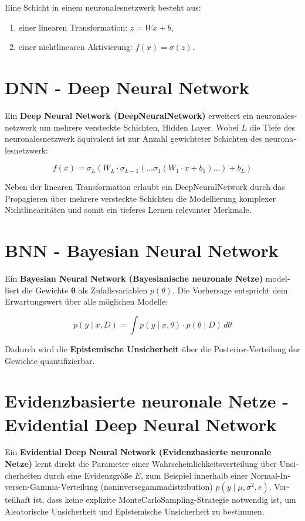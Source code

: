 \begin{otherlanguage}{ngerman}
Eine Schicht in einem \gls{neuronalesnetzwerk} besteht aus:
\begin{enumerate}
  \item einer linearen Transformation: \( z = Wx + b \),
  \item einer nichtlinearen Aktivierung: \( f(x) = \sigma(z) \).
\end{enumerate}


\section*{DNN - Deep Neural Network}

Ein \textbf{Deep Neural Network (\gls{DeepNeuralNetwork})} erweitert ein \gls{neuronalesnetzwerk} um mehrere versteckte Schichten, Hidden Layer. Wobei $L$ die Tiefe des \gls{neuronalesnetzwerk} äquivalent ist zur Anzahl gewichteter Schichten des \gls{neuronalesnetzwerk}:

\[
f(x) = \sigma_L\left(W_L \cdot \sigma_{L-1}\left(\ldots \sigma_1\left(W_1 \cdot x + b_1\right) \ldots \right) + b_L\right)
\]

Neben der linearen Transformation erlaubt ein \gls{DeepNeuralNetwork} durch das Propagieren über mehrere versteckte Schichten die Modellierung komplexer Nichtlinearitäten und somit ein tieferes Lernen relevanter Merkmale.

\section*{BNN - Bayesian Neural Network}

Ein \textbf{Bayesian Neural Network (\gls{Bayesianische neuronale Netze})} modelliert die Gewichte $\boldsymbol{\theta}$ als Zufallsvariablen $p(\theta)$. Die Vorhersage entspricht dem Erwartungswert über alle möglichen Modelle:

\[
p(y \mid x, D) = \int p(y \mid x, \theta) \cdot p(\theta \mid D) \, d\theta
\]

Dadurch wird die \textbf{\gls{Epistemische Unsicherheit}} über die Posterior-Verteilung der Gewichte quantifizierbar.

\section*{\gls{Evidenzbasierte neuronale Netze} - Evidential Deep Neural Network}

Ein \textbf{Evidential Deep Neural Network (\gls{Evidenzbasierte neuronale Netze})} lernt direkt die Parameter einer Wahrscheinlichkeitsverteilung über Unsicherheiten durch eine Evidenzgröße $E$, zum Beispiel innerhalb einer Normal-Inversen-Gamma-Verteilung (\gls{noninversegammadistribution}) $p(y \mid \mu, \sigma^2, e)$. Vorteilhaft ist, dass keine explizite \gls{MonteCarloSampling}-Strategie notwendig ist, um \gls{Aleatorische Unsicherheit} und \gls{Epistemische Unsicherheit} zu bestimmen.


\end{otherlanguage}
